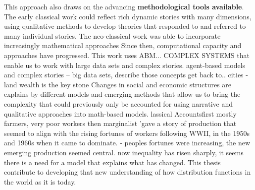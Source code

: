 This approach also draws on the advancing\textbf{ methodological tools available}. The early classical work could reflect rich dynamic stories with many dimensions, using qualitative methods %
to develop theories that responded to and referred to many individual stories. The neo-classical work was able to incorporate increasingly mathematical approaches%
Since then, computational capacity and approaches have progressed. This work uses ABM... COMPLEX SYSTEMS that enable us to work with large data sets and complex stories. %
agent-based models and complex stories
-- big data sets, describe those concepts get back to..
cities - land wealth is the key stone
Changes in social and economic structures are explains by different models and emerging methods that allow us to bring the complexity that could previously only be accounted for using narrative and qualitative approaches into math-based models. 
lassical Accountsfirst mostly farmers, very poor workers
then marginalist  'gave a story of production that seemed to align with the rising fortunes of workers following WWII, in the 1950s and 1960s when it came to dominate. - peoples fortunes were increasing, the new emerging production seemed central.
now inequality has risen sharply, it seems there is a need for a model that explains what has changed. This thesis contribute to developing that new understanding of how distribution functions in the world as it is today. 






